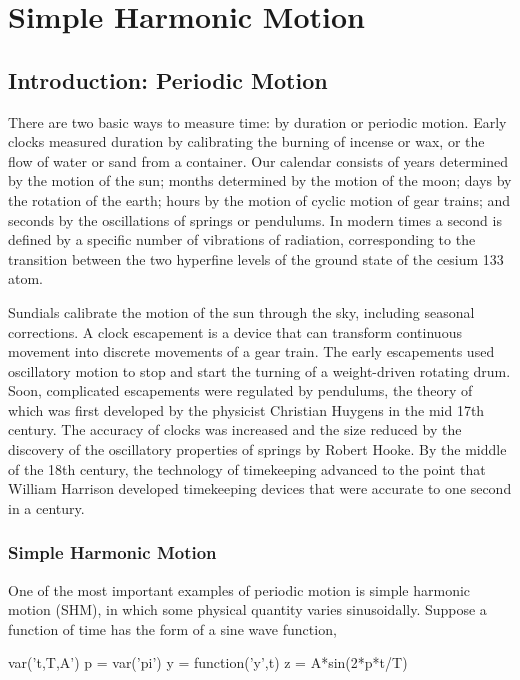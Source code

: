 \chapter{Simple Harmonic Motion}

\section{Introduction: Periodic Motion}

There are two basic ways to measure time: by duration or periodic motion. Early 
clocks measured duration by calibrating the burning of incense or wax, or the 
flow of water or sand from a container. Our calendar consists of years 
determined by the motion of the sun; months determined by the motion of the 
moon; days by the rotation of the earth; hours by the motion of cyclic motion 
of gear trains; and seconds by the oscillations of springs or pendulums. In 
modern times a second is defined by a specific number of vibrations of 
radiation, corresponding to the transition between the two hyperfine levels of 
the ground state of the cesium 133 atom.


Sundials calibrate the motion of the sun through the sky, including seasonal
corrections. A clock escapement is a device that can transform continuous 
movement into discrete movements of a gear train. The early escapements used 
oscillatory motion to stop and start the turning of a weight-driven rotating 
drum. Soon, complicated escapements were regulated by pendulums, the theory of 
which was first developed by the physicist Christian Huygens in the mid 17th 
century. The accuracy of clocks was increased and the size reduced by the 
discovery of the oscillatory properties of springs by Robert Hooke. By the 
middle of the 18th century, the technology of timekeeping advanced to the point 
that William Harrison developed timekeeping devices that were accurate to one 
second in a century. 

\subsection{Simple Harmonic Motion}
One of the most important examples of periodic motion is simple harmonic motion 
(SHM), in which some physical quantity varies sinusoidally. Suppose a function 
of time has the form of a sine wave function,

\begin{sagesilent}
var('t,T,A')
p = var('pi')
y = function('y',t)
z = A*sin(2*p*t/T)
\end{sagesilent}

